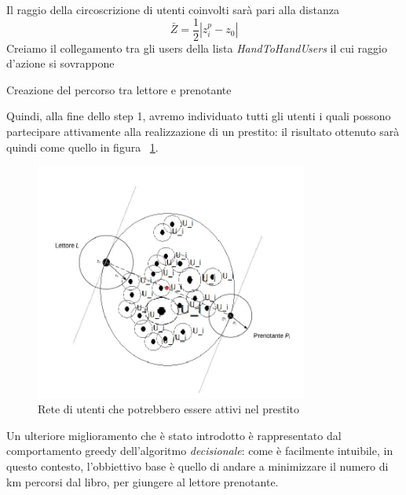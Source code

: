 \begin{itemize}
\begin{itemize}
\begin{algorithm}[H]
			
			Il raggio della circoscrizione di utenti coinvolti sarà pari alla distanza
			\[ \bar{Z} = \dfrac{1}{2} |z^{p}_{i}-z_{0}| \]
			Creiamo il collegamento tra gli users della lista \textit{HandToHandUsers} il cui raggio d'azione si sovrappone\;
			\caption{Creazione del percorso tra lettore e prenotante}
		\end{algorithm}
		
		Quindi, alla fine dello step 1, avremo individuato tutti gli utenti i quali possono partecipare attivamente alla realizzazione di un prestito: il risultato ottenuto sarà quindi come quello in figura ~\ref{fig:UsersNet}.
						
		\begin{figure}[h!]
			\centering
			\includegraphics[width=0.8\textwidth]{Immagini/Algorithm_UsersNet}
			\caption{Rete di utenti che potrebbero essere attivi nel prestito}
			\label{fig:UsersNet}
		\end{figure}
		
	\end{itemize}
\end{itemize}

Un ulteriore miglioramento che è stato introdotto è rappresentato dal comportamento greedy dell'algoritmo \textit{decisionale}: come è facilmente intuibile, in questo contesto, l'obbiettivo base è quello di andare a minimizzare il numero di km percorsi dal libro, per giungere al lettore prenotante.

